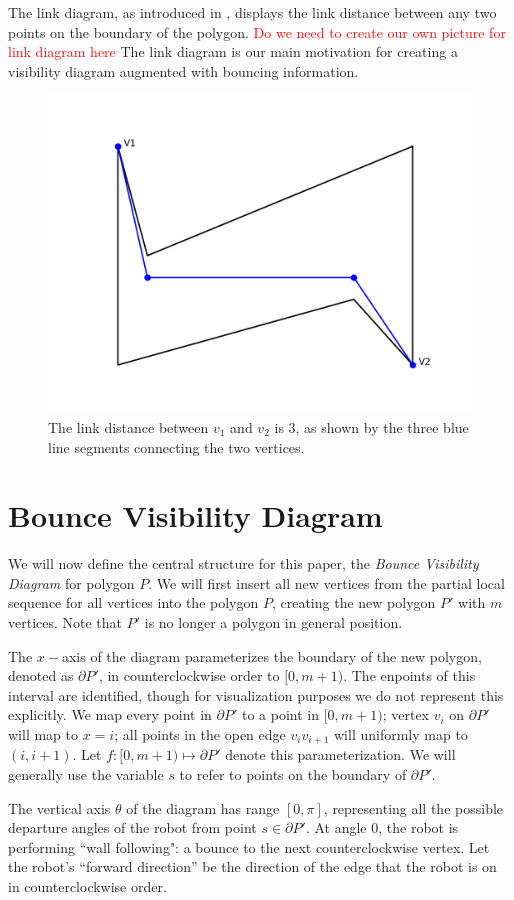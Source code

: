 \documentclass[letterpaper, 10 pt, conference]{ieeeconf}  %
\begin{document}
The link diagram, as introduced in \cite{tan_sweep}, displays the link distance between any two points on the boundary of the polygon. \textcolor{red}{Do we need to create our own picture for link diagram here} The link diagram is our main motivation for creating a visibility diagram augmented with bouncing information.
\begin{figure}
    \includegraphics[width=0.6\linewidth]{images/link_distance.png}
    \centering
    \caption{The link distance between $v_1$ and $v_2$ is 3, as shown by the three blue line segments connecting the two vertices.}\label{fig:link_dis}
    \centering
\end{figure}

\section{Bounce Visibility Diagram}
We will now define the central structure for this paper, the
\textit{Bounce Visibility Diagram} for polygon $P$. We will first insert all new
vertices from the partial local sequence for all vertices into the
polygon $P$, creating the new polygon $P'$ with $m$ vertices. Note that $P'$ is
no longer a polygon in general position.

The $x-$axis of the diagram parameterizes the boundary of the new polygon,
denoted as $\partial P'$, in counterclockwise order to $[0, m+1)$. The
enpoints of this interval are identified, though for visualization purposes we
do not represent this explicitly. We map every
point in $\partial P'$ to a point in $[0, m+1)$; vertex $v_i$ on $\partial P'$
will map to $x = i$; all points in the open edge $v_iv_{i+1}$ will uniformly map
to $(i, i+1)$. Let $f: [0, m+1)\mapsto \partial P'$ denote this
parameterization. We will generally use the variable $s$ to refer to points on
the boundary of $\partial P'$.

The vertical axis $\theta$ of the diagram has range $[0, \pi]$, representing all
the possible departure angles of the robot from point $s \in \partial P'$. 
At angle $0$, the robot is performing ``wall following": a bounce
to the next counterclockwise vertex.
Let the robot's ``forward direction'' be the direction of the edge that the
robot is on in counterclockwise order.
\end{document}

